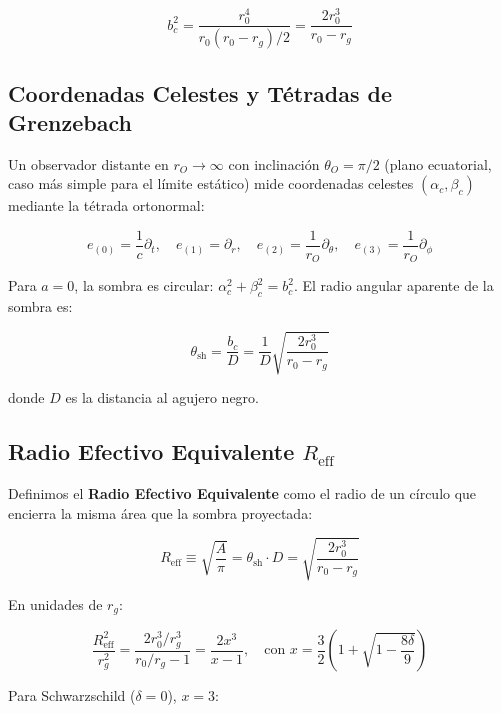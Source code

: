 \documentclass[12pt,a4paper]{article}
\begin{document}
\begin{equation}
b_c^2 = \frac{r_0^4}{r_0(r_0 - r_g)/2} = \frac{2r_0^3}{r_0 - r_g}
\end{equation}

\subsection{Coordenadas Celestes y Tétradas de Grenzebach}

Un observador distante en $r_O \to \infty$ con inclinación $\theta_O = \pi/2$ (plano ecuatorial, caso más simple para el límite estático) mide coordenadas celestes $(\alpha_c, \beta_c)$ mediante la tétrada ortonormal:

\begin{equation}
e_{(0)} = \frac{1}{c}\partial_t, \quad e_{(1)} = \partial_r, \quad e_{(2)} = \frac{1}{r_O}\partial_\theta, \quad e_{(3)} = \frac{1}{r_O}\partial_\phi
\end{equation}

Para $a=0$, la sombra es circular: $\alpha_c^2 + \beta_c^2 = b_c^2$. El radio angular aparente de la sombra es:

\begin{equation}
\theta_{\text{sh}} = \frac{b_c}{D} = \frac{1}{D}\sqrt{\frac{2r_0^3}{r_0 - r_g}}
\end{equation}

donde $D$ es la distancia al agujero negro.

\subsection{Radio Efectivo Equivalente $R_{\text{eff}}$}

Definimos el \textbf{Radio Efectivo Equivalente} como el radio de un círculo que encierra la misma área que la sombra proyectada:

\begin{equation}
R_{\text{eff}} \equiv \sqrt{\frac{A}{\pi}} = \theta_{\text{sh}} \cdot D = \sqrt{\frac{2r_0^3}{r_0 - r_g}}
\end{equation}

En unidades de $r_g$:

\begin{equation}
\frac{R_{\text{eff}}^2}{r_g^2} = \frac{2r_0^3/r_g^3}{r_0/r_g - 1} = \frac{2x^3}{x-1}, \quad \text{con } x = \frac{3}{2}\left(1 + \sqrt{1 - \frac{8\delta}{9}}\right)
\end{equation}

Para Schwarzschild ($\delta=0$), $x=3$:
\end{document}
